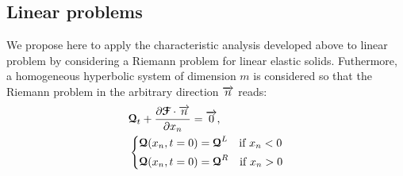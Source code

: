 \subsection{Linear problems}
\label{subsec:charac_Linear_problems}
We propose here to apply the characteristic analysis developed above to linear problem by considering a Riemann problem for linear elastic solids. Futhermore, a homogeneous hyperbolic system of dimension $m$ is considered so that the Riemann problem in the arbitrary direction ${\overrightarrow{n}}$ reads:
\begin{equation}
  \label{eq:Linear_Riemann_problem}
  \begin{aligned}
  &{\boldsymbol{\mathcal{Q}}}_t + \frac{\partial {\boldsymbol{\mathcal{F}}}\cdot {\overrightarrow{n}}}{\partial x_n} = {\overrightarrow{0}}, \\
  &\left\lbrace 
    \begin{aligned}
      & {\boldsymbol{\mathcal{Q}}}(x_n,t=0) = {\boldsymbol{\mathcal{Q}}}^L \quad \text{if } x_n< 0\\
      & {\boldsymbol{\mathcal{Q}}}(x_n,t=0) = {\boldsymbol{\mathcal{Q}}}^R \quad \text{if } x_n> 0
    \end{aligned}
    \right.
  \end{aligned}
\end{equation}


